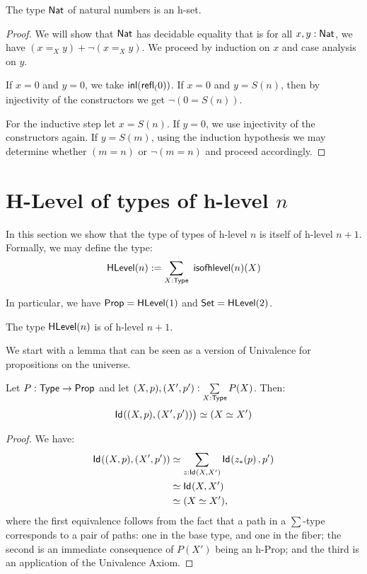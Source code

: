 \begin{thm}\label{prop:nat-is-set}
 The type $\mathsf{Nat}$ of natural numbers is an h-set.
\end{thm}

\begin{proof}
 We will show that $\mathsf{Nat}$ has decidable equality that is for all $x, y : \mathsf{Nat}$, we have $(x =_X y) + \neg (x =_X y)$.
 We proceed by induction on $x$ and case analysis on $y$.

 If $x = 0$ and $y = 0$, we take $\mathsf{inl}(\mathsf{refl}_{(}0))$. If $x = 0$ and $y = S(n)$,
 then by injectivity of the constructors we get $\neg (0 = S (n))$.

 For the inductive step let $x = S (n)$. If $y = 0$, we use injectivity of the constructors again.
 If $y = S (m)$, using the induction hypothesis we may determine whether $(m = n)$ or $\neg(m = n)$ and proceed accordingly.
\end{proof}

\section{H-Level of types of h-level $n$}

In this section we show that the type of types of h-level $n$ is itself of h-level $n+1$. Formally, we may define the type:
 \[\HLevel(n) := \sum_{X : \type} \ \isofhlevel(n)(X) \]

In particular, we have $\mathsf{Prop} = \mathsf{HLevel}(1)$ and $\mathsf{Set} = \mathsf{HLevel}(2)$.

\begin{thm}\label{thm:hleveln_of_hlevelSn}
 The type $\mathsf{HLevel}(n)$ is of h-level $n+1$.
\end{thm}

We start with a lemma that can be seen as a version of Univalence for propositions on the universe.

\begin{lem}\label{lem:sig-id-h-prop}
 Let $P : \mathsf{Type} \to \mathsf{Prop}$ and let $(X, p), (X', p') : \sum\limits_{X : \mathsf{Type}} P(X)$. Then:
 \[ \mathsf{Id}_{}((X, p),(X', p')) \big) \simeq (X \simeq X')\]
\end{lem}

\begin{proof}
 We have:
 \begin{equation*}\begin{split}
 \mathsf{Id}_{}((X, p),(X', p')) & \simeq \sum_{z : \mathsf{Id}_{}(X,X')} \mathsf{Id}_{}({z}_{*}\!\left({p}\right),p') \\
  & \simeq \mathsf{Id}_{}(X,X') \\
  & \simeq (X \simeq X'),
 \end{split}
 \end{equation*}
 where the first equivalence follows from the fact that a path in a $\sum$-type corresponds to a pair of paths: one in the base type, and one in the fiber; the second is an immediate consequence of $P(X')$ being an h-Prop; and the third is an application of the Univalence Axiom.
\end{proof}

